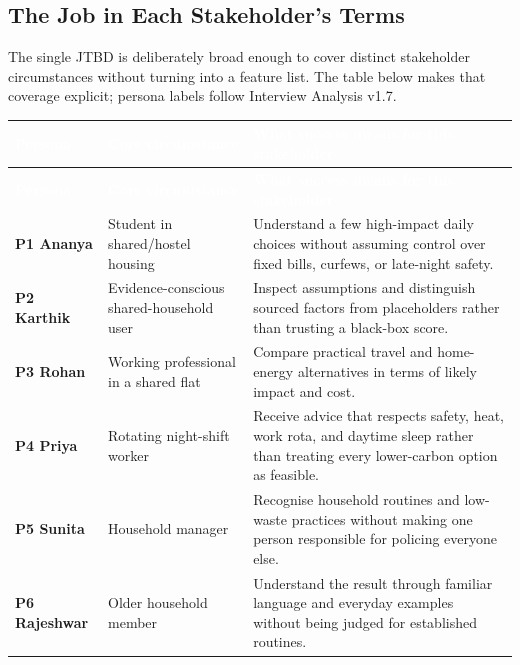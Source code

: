 \documentclass[12pt, a4paper]{article}
\begin{document}
\subsection{The Job in Each Stakeholder's Terms}
The single JTBD is deliberately broad enough to cover distinct stakeholder circumstances without turning into a feature list. The table below makes that coverage explicit; persona labels follow Interview Analysis v1.7.
{\small
{}
\begin{longtable}{|>{\raggedright\arraybackslash}p{2.1cm}|>{\raggedright\arraybackslash}p{3.0cm}|>{\raggedright\arraybackslash}p{12.3cm}|}
\hline
\rowcolor{cNavy}
\textcolor{white}{\textbf{Persona}} & \textcolor{white}{\textbf{Core circumstance}} & \textcolor{white}{\textbf{What success means for this stakeholder}} \\
\hline
\endfirsthead
\hline
\rowcolor{cNavy}
\textcolor{white}{\textbf{Persona}} & \textcolor{white}{\textbf{Core circumstance}} & \textcolor{white}{\textbf{What success means for this stakeholder}} \\
\hline
\endhead
\textbf{P1 Ananya} & Student in shared/hostel housing & Understand a few high-impact daily choices without assuming control over fixed bills, curfews, or late-night safety. \\
\hline
\textbf{P2 Karthik} & Evidence-conscious shared-household user & Inspect assumptions and distinguish sourced factors from placeholders rather than trusting a black-box score. \\
\hline
\textbf{P3 Rohan} & Working professional in a shared flat & Compare practical travel and home-energy alternatives in terms of likely impact and cost. \\
\hline
\textbf{P4 Priya} & Rotating night-shift worker & Receive advice that respects safety, heat, work rota, and daytime sleep rather than treating every lower-carbon option as feasible. \\
\hline
\textbf{P5 Sunita} & Household manager & Recognise household routines and low-waste practices without making one person responsible for policing everyone else. \\
\hline
\textbf{P6 Rajeshwar} & Older household member & Understand the result through familiar language and everyday examples without being judged for established routines. \\
\hline
\end{longtable}
}
\end{document}
